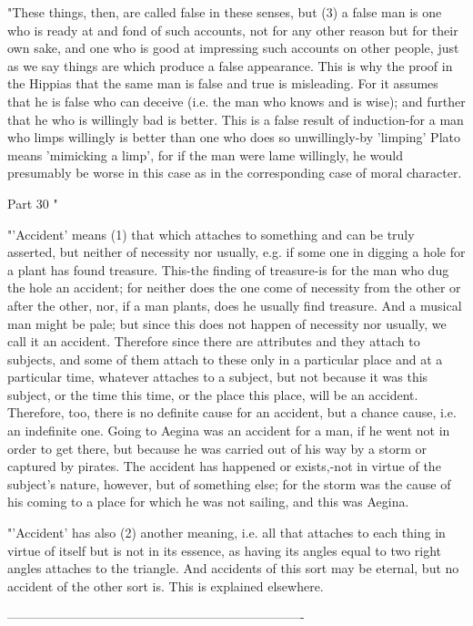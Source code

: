 "These things, then, are called false in these senses, but (3) a false
man is one who is ready at and fond of such accounts, not for any
other reason but for their own sake, and one who is good at impressing
such accounts on other people, just as we say things are which produce
a false appearance. This is why the proof in the Hippias that the
same man is false and true is misleading. For it assumes that he is
false who can deceive (i.e. the man who knows and is wise); and further
that he who is willingly bad is better. This is a false result of
induction-for a man who limps willingly is better than one who does
so unwillingly-by 'limping' Plato means 'mimicking a limp', for if
the man were lame willingly, he would presumably be worse in this
case as in the corresponding case of moral character. 

Part 30 "

"'Accident' means (1) that which attaches to something and can be
truly asserted, but neither of necessity nor usually, e.g. if some
one in digging a hole for a plant has found treasure. This-the finding
of treasure-is for the man who dug the hole an accident; for neither
does the one come of necessity from the other or after the other,
nor, if a man plants, does he usually find treasure. And a musical
man might be pale; but since this does not happen of necessity nor
usually, we call it an accident. Therefore since there are attributes
and they attach to subjects, and some of them attach to these only
in a particular place and at a particular time, whatever attaches
to a subject, but not because it was this subject, or the time this
time, or the place this place, will be an accident. Therefore, too,
there is no definite cause for an accident, but a chance cause, i.e.
an indefinite one. Going to Aegina was an accident for a man, if he
went not in order to get there, but because he was carried out of
his way by a storm or captured by pirates. The accident has happened
or exists,-not in virtue of the subject's nature, however, but of
something else; for the storm was the cause of his coming to a place
for which he was not sailing, and this was Aegina. 

"'Accident' has also (2) another meaning, i.e. all that attaches to
each thing in virtue of itself but is not in its essence, as having
its angles equal to two right angles attaches to the triangle. And
accidents of this sort may be eternal, but no accident of the other
sort is. This is explained elsewhere. 

----------------------------------------------------------------------

